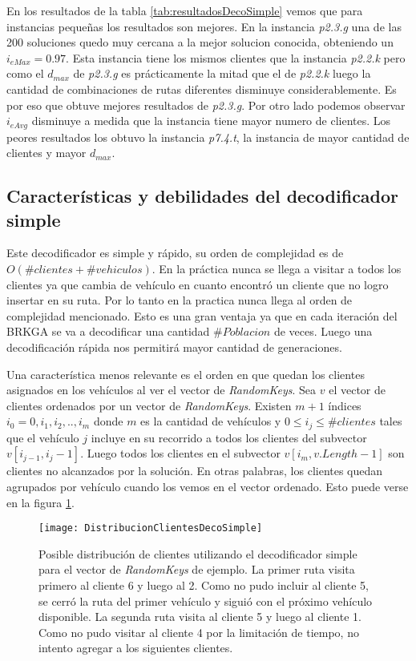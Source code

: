 En los resultados de la tabla \ref{tab:resultadosDecoSimple} vemos que para instancias pequeñas los resultados son mejores. En la instancia \textit{p2.3.g} una de las 200 soluciones quedo muy cercana a la mejor solucion conocida, obteniendo un $i_{eMax}=0.97$. Esta instancia tiene los mismos clientes que la instancia \textit{p2.2.k} pero como el $d_{max}$ de \textit{p2.3.g} es prácticamente la mitad que el de \textit{p2.2.k} luego la cantidad de combinaciones de rutas diferentes disminuye considerablemente. Es por eso que obtuve mejores resultados de \textit{p2.3.g}. Por otro lado podemos observar $i_{eAvg}$ disminuye a medida que la instancia tiene mayor numero de clientes. Los peores resultados los obtuvo la instancia \textit{p7.4.t}, la instancia de mayor cantidad de clientes y mayor $d_{max}$.

\subsection{Características y debilidades del decodificador simple}

Este decodificador es simple y rápido, su orden de complejidad es de $O(\#clientes + \#vehiculos)$. En la práctica nunca se llega a visitar a todos los clientes ya que cambia de vehículo en cuanto encontró un cliente que no logro insertar en su ruta. Por lo tanto en la practica nunca llega al orden de complejidad mencionado. Esto es una gran ventaja ya que en cada iteración del BRKGA se va a decodificar una cantidad $\#Poblacion$ de veces. Luego una decodificación rápida nos permitirá mayor cantidad de generaciones.

\bigskip

Una característica menos relevante es el orden en que quedan los clientes asignados en los vehículos al ver el vector de \textit{RandomKeys}.  Sea $v$ el vector de clientes ordenados por un vector de \textit{RandomKeys}. Existen $m+1$ índices $i_0 = 0, i_1, i_2, .., i_m$ donde $m$ es la cantidad de vehículos y $0 \leq i_j \leq \#clientes$ tales que el vehículo $j$ incluye en su recorrido a todos los clientes del subvector $v[i_{j-1}, i_j-1]$. Luego todos los clientes en el subvector $v[i_m, v.Length - 1]$ son clientes no alcanzados por la solución. En otras palabras, los clientes quedan agrupados por vehículo cuando los vemos en el vector ordenado. Esto puede verse en la figura \ref{fig:DistribucionClientesDecoSimple}.

\begin{figure}[h]
	\caption{Posible distribución de clientes utilizando el decodificador simple para el vector de \textit{RandomKeys} de ejemplo. La primer ruta visita primero al cliente 6 y luego al 2. Como no pudo incluir al cliente 5, se cerró la ruta del primer vehículo y siguió con el próximo vehículo disponible. La segunda ruta visita al cliente 5 y luego al cliente 1. Como no pudo visitar al cliente 4 por la limitación de tiempo, no intento agregar a los siguientes clientes.}
	\centering
	\texttt{[image: DistribucionClientesDecoSimple]}
	\label{fig:DistribucionClientesDecoSimple}
\end{figure}

